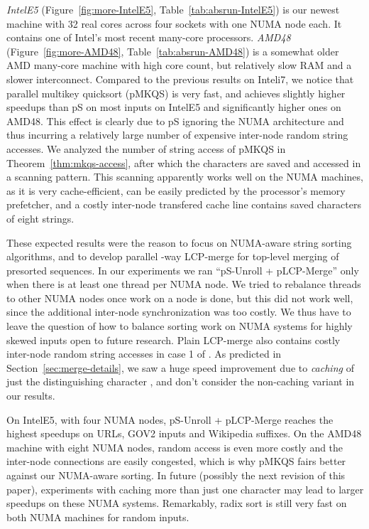 \documentclass[a4paper]{myjournal}
\begin{document}
\emph{IntelE5} (Figure~\ref{fig:more-IntelE5}, Table~\ref{tab:absrun-IntelE5}) is our newest machine with 32
real cores across four sockets with one NUMA node each. It contains one of
Intel's most recent many-core processors. \emph{AMD48}
(Figure~\ref{fig:more-AMD48}, Table~\ref{tab:absrun-AMD48}) is a somewhat older AMD many-core machine with
high core count, but relatively slow RAM and a slower interconnect.  Compared to
the previous results on Inteli7, we notice that parallel multikey quicksort (pMKQS) is very
fast, and achieves slightly higher speedups than pS on most inputs on
IntelE5 and significantly higher ones on AMD48.  This effect is clearly due to
pS ignoring the NUMA architecture and thus incurring a relatively large
number of expensive inter-node random string accesses. We analyzed the number of
string access of pMKQS in Theorem~\ref{thm:mkqs-access}, after which the
characters are saved and accessed in a scanning pattern. This scanning
apparently works well on the NUMA machines, as it is very cache-efficient, can
be easily predicted by the processor's memory prefetcher, and a costly
inter-node transfered cache line contains saved characters of eight strings.

These expected results were the reason to focus on NUMA-aware string sorting
algorithms, and to develop parallel -way LCP-merge for top-level merging of
presorted sequences. In our experiments we ran ``pS-Unroll + pLCP-Merge''
only when there is at least one thread per NUMA node. We tried to rebalance
threads to other NUMA nodes once work on a node is done, but this did not work
well, since the additional inter-node synchronization was too costly. We thus
have to leave the question of how to balance sorting work on NUMA systems for
highly skewed inputs open to future research.  Plain LCP-merge also contains
costly inter-node random string accesses in case 1 of \LCPCompare. As predicted
in Section~\ref{sec:merge-details}, we saw a huge speed improvement due to
\emph{caching} of just the distinguishing character , and don't
consider the non-caching variant in our results.

On IntelE5, with four NUMA nodes, pS-Unroll + pLCP-Merge reaches the highest
speedups on URLs, GOV2 inputs and Wikipedia suffixes. On the AMD48 machine with
eight NUMA nodes, random access is even more costly and the inter-node
connections are easily congested, which is why pMKQS fairs better against our
NUMA-aware sorting.  In future (possibly the next revision of this
paper), experiments with caching more than just one character may lead to larger
speedups on these NUMA systems. Remarkably, radix sort is still very fast on
both NUMA machines for random inputs.
\end{document}
